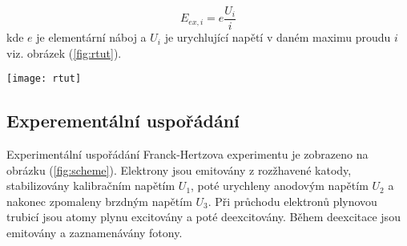 \documentclass[a4paper,11pt]{article}
\begin{document}
    \begin{minipage}[t]{0.5\textwidth} 
                \begin{equation}
                    E_{ex, i} = e \frac{U_i}{i}
                \end{equation}
                kde $e$ je elementární náboj a $U_i$ je urychlující napětí v daném maximu proudu $i$ viz. obrázek (\ref{fig:rtut}).

                \vspace{10pt}   
                \par \centering
                \texttt{[image: rtut]}
                \captionsetup{justification=centering, font=footnotesize}
                \label{fig:rtut}
                \vspace{10pt}
                \raggedright 

            \subsection{Experementální uspořádání}
                \par Experimentální uspořádání Franck-Hertzova experimentu je zobrazeno na obrázku (\ref{fig:scheme}). Elektrony jsou emitovány z rozžhavené katody, stabilizovány kalibračním napětím $U_1$, poté urychleny anodovým napětím $U_2$ a nakonec zpomaleny brzdným napětím $U_3$. Při průchodu elektronů plynovou trubicí jsou atomy plynu excitovány a poté deexcitovány. Během deexcitace jsou emitovány a zaznamenávány fotony. 
                
    \end{minipage}
\newpage
\end{document}
